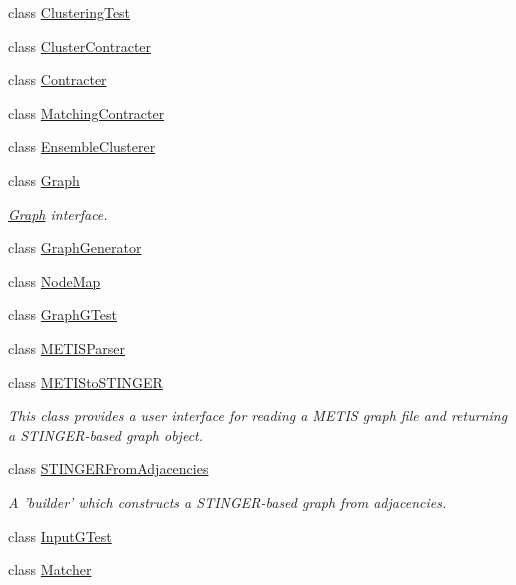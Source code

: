 \begin{DoxyCompactItemize}
class \hyperlink{class_ensemble_clustering_1_1_clustering_test}{Clustering\-Test}
\item 
class \hyperlink{class_ensemble_clustering_1_1_cluster_contracter}{Cluster\-Contracter}
\item 
class \hyperlink{class_ensemble_clustering_1_1_contracter}{Contracter}
\item 
class \hyperlink{class_ensemble_clustering_1_1_matching_contracter}{Matching\-Contracter}
\item 
class \hyperlink{class_ensemble_clustering_1_1_ensemble_clusterer}{Ensemble\-Clusterer}
\item 
class \hyperlink{class_ensemble_clustering_1_1_graph}{Graph}
\begin{DoxyCompactList}\small\item\em \hyperlink{class_ensemble_clustering_1_1_graph}{Graph} interface. \end{DoxyCompactList}\item 
class \hyperlink{class_ensemble_clustering_1_1_graph_generator}{Graph\-Generator}
\item 
class \hyperlink{class_ensemble_clustering_1_1_node_map}{Node\-Map}
\item 
class \hyperlink{class_ensemble_clustering_1_1_graph_g_test}{Graph\-G\-Test}
\item 
class \hyperlink{class_ensemble_clustering_1_1_m_e_t_i_s_parser}{M\-E\-T\-I\-S\-Parser}
\item 
class \hyperlink{class_ensemble_clustering_1_1_m_e_t_i_sto_s_t_i_n_g_e_r}{M\-E\-T\-I\-Sto\-S\-T\-I\-N\-G\-E\-R}
\begin{DoxyCompactList}\small\item\em This class provides a user interface for reading a M\-E\-T\-I\-S graph file and returning a S\-T\-I\-N\-G\-E\-R-\/based graph object. \end{DoxyCompactList}\item 
class \hyperlink{class_ensemble_clustering_1_1_s_t_i_n_g_e_r_from_adjacencies}{S\-T\-I\-N\-G\-E\-R\-From\-Adjacencies}
\begin{DoxyCompactList}\small\item\em A 'builder' which constructs a S\-T\-I\-N\-G\-E\-R-\/based graph from adjacencies. \end{DoxyCompactList}\item 
class \hyperlink{class_ensemble_clustering_1_1_input_g_test}{Input\-G\-Test}
\item 
class \hyperlink{class_ensemble_clustering_1_1_matcher}{Matcher}
\item 

\end{DoxyCompactItemize}
